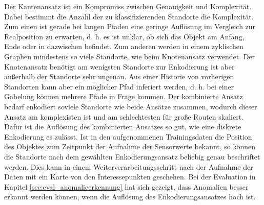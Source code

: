 Der Kantenansatz ist ein Kompromiss zwischen Genauigkeit und Komplexität.
Dabei bestimmt die Anzahl der zu klassifizierenden Standorte die Komplexität.
Zum einen ist gerade bei langen Pfaden eine geringe Auflösung im Vergleich zur Realposition zu erwarten,
d. h. es ist unklar, ob sich das Objekt am Anfang, Ende oder in dazwischen befindet.
Zum anderen werden in einem zyklischen Graphen mindestens so viele Standorte, wie beim Knotenansatz verwendet.
Der Knotenansatz benötigt am wenigsten Standorte zur Enkodierung ist aber außerhalb der Standorte sehr ungenau.
Aus einer Historie von vorherigen Standorten kann aber ein möglicher Pfad inferiert werden,
d. h. bei einer Gabelung können mehrere Pfade in Frage kommen.
Der kombinierte Ansatz bedarf enkodiert soviele Standorte wie beide Ansätze zusammen,
wodurch dieser Ansatz am komplexisten ist und am schlechtesten für große Routen skaliert.
Dafür ist die Auflösung des kombinierten Ansatzes so gut, wie eine diskrete Enkodierung es zulässt.
\newline
\newline
Ist in den aufgenommenen Trainingsdaten die Position des Objektes zum Zeitpunkt der Aufnahme der Sensorwerte bekannt,
so können die Standorte nach dem gewählten Enkodierungsansatz beliebig genau beschriftet werden.
Dies kann in einem Weiterverarbeitungsschritt nach der Aufnahme der Daten mit ein Karte von den Interessepunkten geschehen.
\newline
\newline
Bei der Evaluation in Kapitel \ref{sec:eval_anomalieerkennung} hat sich gezeigt, dass Anomalien besser erkannt werden können,
wenn die Auflösung des Enkodierungsansatzes hoch ist.